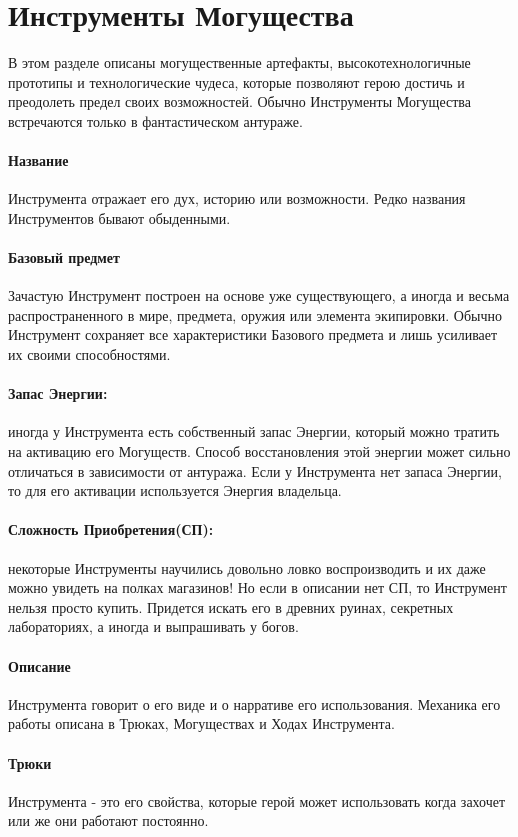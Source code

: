 \section{Инструменты Могущества \tbd}
В этом разделе описаны могущественные артефакты, высокотехнологичные прототипы и технологические чудеса, которые позволяют герою достичь и преодолеть предел своих возможностей. Обычно Инструменты Могущества встречаются только в фантастическом антураже.

\paragraph{Название} Инструмента отражает его дух, историю или возможности. Редко названия Инструментов бывают обыденными.
\paragraph{Базовый предмет} Зачастую Инструмент построен на основе уже существующего, а иногда и весьма распространенного в мире, предмета, оружия или элемента экипировки. Обычно Инструмент сохраняет все характеристики Базового предмета и лишь усиливает их своими способностями.
\paragraph{Запас Энергии: }иногда у Инструмента есть собственный запас Энергии, который можно тратить на активацию его Могуществ. Способ восстановления этой энергии может сильно отличаться в зависимости от антуража. Если у Инструмента нет запаса Энергии, то для его активации используется Энергия владельца.
\paragraph{Сложность Приобретения(СП): }некоторые Инструменты научились довольно ловко воспроизводить и их даже можно увидеть на полках магазинов! Но если в описании нет СП, то Инструмент нельзя просто купить. Придется искать его в древних руинах, секретных лабораториях, а иногда и выпрашивать у богов.
\paragraph{Описание }Инструмента говорит о его виде и о нарративе его использования. Механика его работы описана в Трюках, Могуществах и Ходах Инструмента.
\paragraph{Трюки }Инструмента - это его свойства, которые герой может использовать когда захочет или же они работают постоянно.
